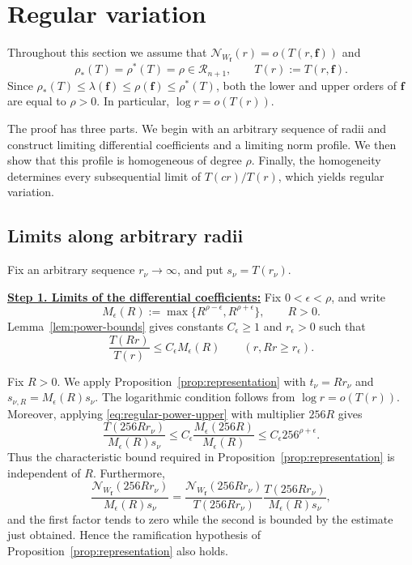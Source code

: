 \documentclass[12pt,letterpaper,reqno]{amsart}
\theoremstyle{definition}
\numberwithin{equation}{section}
\newcommand{\NN}{\mathcal N}
\newcommand{\Gn}{\mathcal R_{n+1}}
\newcommand{\fv}{\bm f}
\begin{document}
\section{Regular variation}\label{sec:regular}

Throughout this section we assume that
\(\NN_{W_{\fv}}(r)=o(T(r,\fv))\) and
\[
\rho_*(T)=\rho^*(T)=\rho\in\Gn,
\qquad
T(r):=T(r,\fv).
\]
Since
\(\rho_*(T)\leq\lambda(\fv)\leq\rho(\fv)\leq\rho^*(T)\),
both the lower and upper orders of \(\fv\) are equal to \(\rho>0\).
In particular, \(\log r=o(T(r))\).

The proof has three parts. We begin with an arbitrary sequence of
radii and construct limiting differential coefficients and a limiting
norm profile. We then show that this profile is homogeneous of degree
\(\rho\). Finally, the homogeneity determines every subsequential limit
of \(T(cr)/T(r)\), which yields regular variation.


\subsection{Limits along arbitrary radii}

Fix an arbitrary sequence \(r_\nu\to\infty\), and put
\(s_\nu=T(r_\nu)\).

\medskip\noindent
\textbf{\underline{Step 1. Limits of the differential coefficients:}}
Fix \(0<\epsilon<\rho\), and write
\[
M_\epsilon(R)
:=
\max\{R^{\rho-\epsilon},R^{\rho+\epsilon}\},
\qquad R>0.
\]
Lemma~\ref{lem:power-bounds} gives constants
\(C_\epsilon\geq1\) and \(r_\epsilon>0\) such that
\begin{equation}\label{eq:regular-power-upper}
 \frac{T(Rr)}{T(r)}
 \leq
 C_\epsilon M_\epsilon(R)
 \qquad
 (r,Rr\geq r_\epsilon).
\end{equation}

Fix \(R>0\). We apply Proposition~\ref{prop:representation} with
\(t_\nu=Rr_\nu\) and
\(s_{\nu,R}=M_\epsilon(R)s_\nu\).
The logarithmic condition follows from
\(\log r=o(T(r))\). Moreover, applying
\eqref{eq:regular-power-upper} with multiplier \(256R\) gives
\[
\frac{T(256Rr_\nu)}{M_\epsilon(R)s_\nu}
\leq
C_\epsilon
\frac{M_\epsilon(256R)}{M_\epsilon(R)}
\leq
C_\epsilon256^{\rho+\epsilon}.
\]
Thus the characteristic bound required in
Proposition~\ref{prop:representation} is independent of \(R\).
Furthermore,
\[
\frac{\NN_{W_{\fv}}(256Rr_\nu)}
     {M_\epsilon(R)s_\nu}
=
\frac{\NN_{W_{\fv}}(256Rr_\nu)}
     {T(256Rr_\nu)}
\frac{T(256Rr_\nu)}
     {M_\epsilon(R)s_\nu},
\]
and the first factor tends to zero while the second is bounded by the
estimate just obtained. Hence the ramification hypothesis of
Proposition~\ref{prop:representation} also holds.
\end{document}
